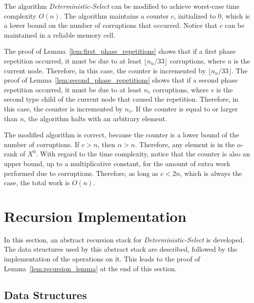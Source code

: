 \documentclass{llncs}
\begin{document}
\begin{pf}
The algorithm \emph{Deterministic-Select} can be modified to achieve worst-case time complexity $O(n)$. The algorithm maintains a counter $c$, initialized to $0$, which is a lower bound on the number of corruptions that occurred. Notice that $c$ can be maintained in a reliable memory cell.

The proof of Lemma~\ref{lem:first_phase_repetitions} shows that if a first phase repetition occurred, it must be due to at least $\lfloor n_u / 33 \rfloor$ corruptions, where $u$ is the current node. Therefore, in this case, the counter is incremented by $\lfloor n_u / 33 \rfloor$. The proof of Lemma~\ref{lem:second_phase_repetitions} shows that if a second phase repetition occurred, it must be due to at least $n_v$ corruptions, where $v$ is the second type child of the current node that caused the repetition. Therefore, in this case, the counter is incremented by $n_v$. If the counter is equal to or larger than $n$, the algorithm halts with an arbitrary element.

\newpage
The modified algorithm is correct, because the counter is a lower bound of the number of corruptions. If $c > n$, then $\alpha > n$. Therefore, any element is in the $\alpha$-rank of $X^0$. With regard to the time complexity, notice that the counter is also an upper bound, up to a multiplicative constant, for the amount of extra work performed due to corruptions. Therefore, as long as $c < 2n$, which is always the case, the total work is $O(n)$.
\end{pf}















\section{Recursion Implementation}
\label{sec:recursion_implementation}

In this section, an abstract recursion stack for \emph{Deterministic-Select} is developed. The data structures used by this abstract stack are described, followed by the implementation of the operations on it. This leads to the proof of Lemma~\ref{lem:recursion_lemma} at the end of this section.

\subsection{Data Structures}
\label{subsec:recursion_data_structures}
\end{document}
